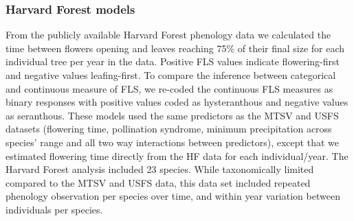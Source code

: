 \documentclass[12pt]{article}\usepackage[]{graphicx}\usepackage[]{color}
\begin{document}
\subsubsection*{Harvard Forest models}
From the publicly available Harvard Forest phenology data \citep{Okeefe2015} we calculated the time between flowers opening and leaves reaching 75\% of their final size for each individual tree per year in the data. Positive FLS values indicate flowering-first and negative values leafing-first. To compare the inference between categorical and continuous measure of FLS, we re-coded the continuous FLS measures as binary responses with positive values coded as hysteranthous and negative values as seranthous. These models used the same predictors as the MTSV and USFS datasets (flowering time, pollination syndrome, minimum precipitation across species' range and all two way interactions between predictors), except that we estimated flowering time directly from the HF data for each individual/year. The Harvard Forest analysis included 23 species. While taxonomically limited compared to the MTSV and USFS data, this data set included repeated phenology observation per species over time, and within year variation between individuals per species. \\ 
\end{document}
